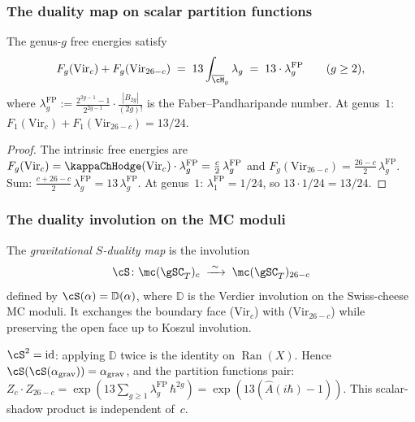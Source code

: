 \subsubsection*{The duality map on scalar partition functions}

\begin{proposition}
\label{prop:gravity-genus-tower-duality}
The genus-$g$ free energies satisfy
\begin{equation}\label{eq:genus-tower-duality}
F_g(\mathrm{Vir}_c) + F_g(\mathrm{Vir}_{26-c})
\;=\;
13 \int_{\overline{\cM}_g} \lambda_g
\;=\;
13 \cdot \lambda_g^{\mathrm{FP}}
\qquad
(g \ge 2),
\end{equation}
where $\lambda_g^{\mathrm{FP}}
:= \frac{2^{2g-1}-1}{2^{2g-1}} \cdot \frac{|B_{2g}|}{(2g)!}$
is the Faber--Pandharipande number.
At genus~$1$:
$F_1(\mathrm{Vir}_c) + F_1(\mathrm{Vir}_{26-c})
= 13/24$.
\end{proposition}

\begin{proof}
The intrinsic free energies are
$F_g(\mathrm{Vir}_c)
= \kappaChHodge(\mathrm{Vir}_c) \cdot \lambda_g^{\mathrm{FP}}
= \frac{c}{2}\,\lambda_g^{\mathrm{FP}}$ and
$F_g(\mathrm{Vir}_{26-c})
= \frac{26-c}{2}\,\lambda_g^{\mathrm{FP}}$.
Sum: $\frac{c + 26 - c}{2}\,\lambda_g^{\mathrm{FP}}
= 13\,\lambda_g^{\mathrm{FP}}$.
At genus~$1$: $\lambda_1^{\mathrm{FP}} = 1/24$, so
$13 \cdot 1/24 = 13/24$.
\end{proof}

\subsubsection*{The duality involution on the MC moduli}

\begin{definition}
\label{def:gravity-s-duality-map}
The \emph{gravitational $S$-duality map} is the involution
\[
\cS \colon
\mc(\gSC_T)_c
\;\xrightarrow{\;\sim\;}\;
\mc(\gSC_T)_{26-c}
\]
defined by $\cS(\alpha) = \mathbb{D}(\alpha)$, where $\mathbb{D}$
is the Verdier involution on the Swiss-cheese MC moduli. It
exchanges the boundary face ($\mathrm{Vir}_c$) with
($\mathrm{Vir}_{26-c}$) while preserving the open face up to
Koszul involution.
\end{definition}

\begin{remark}
\label{rem:gravity-s-duality-order-two}
$\cS^2 = \mathrm{id}$: applying $\mathbb{D}$ twice is the
identity on $\operatorname{Ran}(X)$. Hence
$\cS(\cS(\alpha_{\mathrm{grav}}))
= \alpha_{\mathrm{grav}}$, and the partition functions pair:
$Z_c \cdot Z_{26-c}
= \exp\!\left(13\sum_{g \ge 1}\lambda_g^{\mathrm{FP}}\,\hbar^{2g}\right)
= \exp\!\left(13(\hat A(i\hbar) - 1)\right)$.
This scalar-shadow product is independent of~$c$.
\end{remark}

